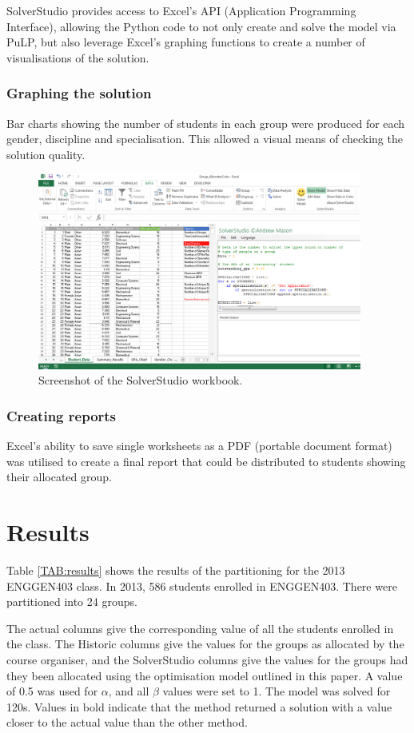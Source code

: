 \documentclass[12pt]{ORSNZ}
\begin{document}
SolverStudio provides access to Excel's API (Application Programming Interface), allowing the Python code to not only create and solve the model via PuLP, but also leverage Excel's graphing functions to create a number of visualisations of the solution.

\subsubsection{Graphing the solution}
Bar charts showing the number of students in each group were produced for each gender, discipline and specialisation. This allowed a visual means of checking the solution quality. 

\begin{figure}[!ht]
	\centering
	\includegraphics[width=0.95\textwidth]{solverstudio_screenshot.pdf}
	\caption{Screenshot of the SolverStudio workbook.}
\end{figure}

\subsubsection{Creating reports}
Excel's ability to save single worksheets as a PDF (portable document format) was utilised to create a final report that could be distributed to students showing their allocated group.

\section{Results}
Table \ref{TAB:results} shows the results of the partitioning for the 2013 ENGGEN403 class. In 2013, 586 students enrolled in ENGGEN403. There were partitioned into 24 groups. 

The actual columns give the corresponding value of all the students enrolled in the class. The Historic columns give the values for the groups as allocated by the course organiser, and the SolverStudio columns give the values for the groups had they been allocated using the optimisation model outlined in this paper. 
A value of 0.5 was used for $\alpha$, and all $\beta$ values were set to 1. The model was solved for 120s.
Values in bold indicate that the method returned a solution with a value closer to the actual value than the other method.
\end{document}
